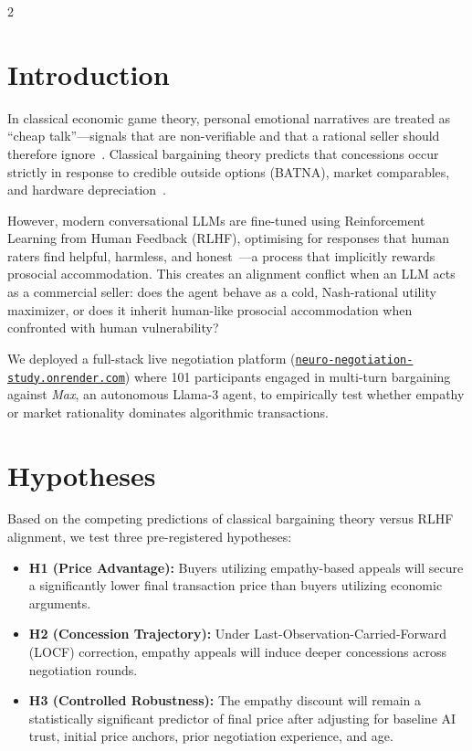 \documentclass[10pt,a4paper]{article}
\begin{document}
\begin{multicols}{2}

\section{Introduction}

In classical economic game theory, personal emotional narratives are treated as ``cheap talk''---signals that are non-verifiable and that a rational seller should therefore ignore~\cite{crawford1982}. Classical bargaining theory predicts that concessions occur strictly in response to credible outside options (BATNA), market comparables, and hardware depreciation~\cite{nash1950,rubinstein1982}.

However, modern conversational LLMs are fine-tuned using Reinforcement Learning from Human Feedback (RLHF), optimising for responses that human raters find helpful, harmless, and honest~\cite{ouyang2022}---a process that implicitly rewards prosocial accommodation. This creates an alignment conflict when an LLM acts as a commercial seller: does the agent behave as a cold, Nash-rational utility maximizer, or does it inherit human-like prosocial accommodation when confronted with human vulnerability?

We deployed a full-stack live negotiation platform (\href{https://neuro-negotiation-study.onrender.com/}{\texttt{neuro-negotiation-study.onrender.com}}) where 101 participants engaged in multi-turn bargaining against \emph{Max}, an autonomous Llama-3 agent, to empirically test whether empathy or market rationality dominates algorithmic transactions.

\section{Hypotheses}

Based on the competing predictions of classical bargaining theory versus RLHF alignment, we test three pre-registered hypotheses:

\begin{itemize}
  \item \textbf{H1 (Price Advantage):} Buyers utilizing empathy-based appeals will secure a significantly lower final transaction price than buyers utilizing economic arguments.
  \item \textbf{H2 (Concession Trajectory):} Under Last-Observation-Carried-Forward (LOCF) correction, empathy appeals will induce deeper concessions across negotiation rounds.
  \item \textbf{H3 (Controlled Robustness):} The empathy discount will remain a statistically significant predictor of final price after adjusting for baseline AI trust, initial price anchors, prior negotiation experience, and age.
\end{itemize}


\end{multicols}
\end{document}
